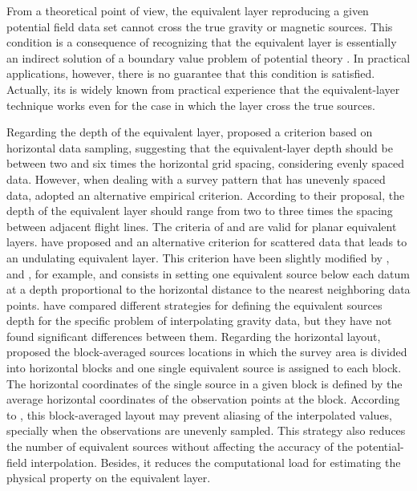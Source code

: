 From a theoretical point of view, the equivalent layer reproducing a given potential field data set cannot cross the
true gravity or magnetic sources. This condition is a consequence of recognizing that the equivalent layer is essentially an indirect solution of 
a boundary value problem of potential theory \citep[e.g.,][]{roy1962,zidarov1965,dampney1969,li_etal_2014,reis-etal2020}.
In practical applications, however, there is no guarantee that this condition is satisfied. 
Actually, its is widely known from practical experience \cite[e.g.,][]{gonzalez-etal2022} that the equivalent-layer technique
works even for the case in which the layer cross the true sources. 

Regarding the depth of the equivalent layer, \citet{dampney1969}  proposed a criterion based on horizontal data sampling, 
suggesting that the equivalent-layer depth should be between two and six times the horizontal grid spacing, 
considering evenly spaced data. 
However, when dealing with a survey pattern that has unevenly spaced data, \citet{reis-etal2020} adopted an alternative 
empirical criterion. 
According to their proposal, the depth of the equivalent layer should range from two to three times the spacing between 
adjacent flight lines.
The criteria of \citet{dampney1969} and \citet{reis-etal2020} are valid for planar equivalent layers. 
\citet{cordell1992} have proposed and an alternative criterion for scattered data that leads to an undulating equivalent layer.
This criterion have been slightly modified by \citet{guspi-etal2004}, \citet{guspi-novara2009} and \citet{soler-uieda2021},
for example, and consists in setting one equivalent source below each datum at a depth 
proportional to the horizontal distance to the nearest neighboring data points.
\citet{soler-uieda2021} have compared different strategies for defining the equivalent sources depth for the specific
problem of interpolating gravity data, but they have not found significant differences between them.
Regarding the horizontal layout, \cite{soler-uieda2021} proposed the block-averaged sources locations 
in which the survey area is divided into horizontal blocks and one single equivalent source is assigned to each block. 
The horizontal coordinates of the single source in a given block is defined by the average horizontal 
coordinates of the observation points at the block. 
According to \cite{soler-uieda2021}, this block-averaged layout may prevent aliasing of the interpolated 
values, specially when the observations are unevenly sampled.
This strategy also reduces the number of equivalent sources without affecting the accuracy of the potential-field interpolation. 
Besides, it reduces the computational load for estimating the physical property on the equivalent layer.

